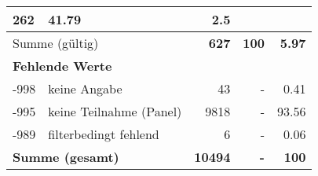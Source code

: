 \begin{longtable}{lXrrr}
       \num{262} &
       \num[round-mode=places,round-precision=2]{41.79} &
         \num[round-mode=places,round-precision=2]{2.5} \\
     \midrule
     \multicolumn{2}{l}{Summe (gültig)} &
       \textbf{\num{627}} &
     \textbf{\num{100}} &
       \textbf{\num[round-mode=places,round-precision=2]{5.97}} \\
     \multicolumn{5}{l}{\textbf{Fehlende Werte}}\\
       -998 &
       keine Angabe &
         \num{43} &
        - &
         \num[round-mode=places,round-precision=2]{0.41} \\
       -995 &
       keine Teilnahme (Panel) &
         \num{9818} &
        - &
         \num[round-mode=places,round-precision=2]{93.56} \\
       -989 &
       filterbedingt fehlend &
         \num{6} &
        - &
         \num[round-mode=places,round-precision=2]{0.06} \\
     \midrule
     \multicolumn{2}{l}{\textbf{Summe (gesamt)}} &
          \textbf{\num{10494}} &
        \textbf{-} &
        \textbf{\num{100}} \\
     \bottomrule
     \end{longtable}
     
